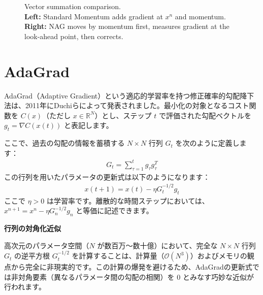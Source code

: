 \documentclass[dvipdfmx,a4paper,11pt]{jsarticle}
\begin{document}
\begin{figure}[H]
    \caption{Vector summation comparison.\\ \textbf{Left:} Standard Momentum adds gradient at $x^n$ and momentum. \\ \textbf{Right:} NAG moves by momentum first, measures gradient at the look-ahead point, then corrects.}
\end{figure}
\section{AdaGrad}
AdaGrad（Adaptive Gradient）という適応的学習率を持つ修正確率的勾配降下法は、2011年にDuchiらによって発表されました。最小化の対象となるコスト関数を $C(x)$（ただし $x \in \mathbb{R}^N$）とし、ステップ $t$ で評価された勾配ベクトルを $g_t = \nabla C(x(t))$ と表記します。

ここで、過去の勾配の情報を蓄積する $N \times N$ 行列 $G_t$ を次のように定義します：
\begin{align*}
    G_t = \sum_{\tau=1}^t g_\tau g_\tau^T
\end{align*}
この行列を用いたパラメータの更新式は以下のようになります：
\begin{align*}
    x(t+1) = x(t) - \eta G_t^{-1/2} g_t
\end{align*}
ここで $\eta > 0$ は学習率です。離散的な時間ステップにおいては、$x^{n+1} = x^n - \eta G_n^{-1/2} g_n$ と等価に記述できます。

\hosoku \textbf{行列の対角化近似}

高次元のパラメータ空間（$N$ が数百万〜数十億）において、完全な $N \times N$ 行列 $G_t$ の逆平方根 $G_t^{-1/2}$ を計算することは、計算量（$\mathcal{O}(N^3)$）およびメモリの観点から完全に非現実的です。この計算の爆発を避けるため、AdaGradの更新式では非対角要素（異なるパラメータ間の勾配の相関）を $0$ とみなす巧妙な近似が行われます。
\end{document}
